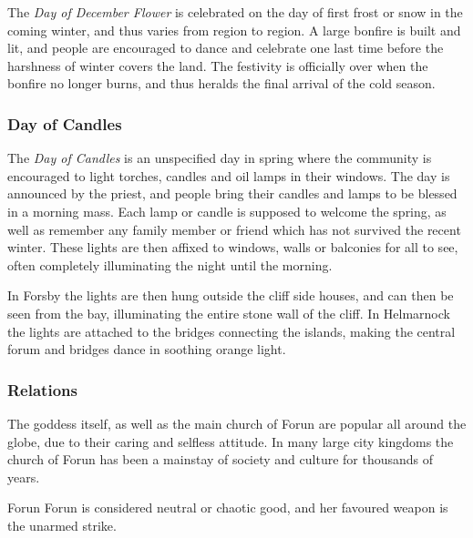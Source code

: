 
The \emph{Day of December Flower} is celebrated on the day of first frost or
snow in the coming winter, and thus varies from region to region. A large
bonfire is built and lit, and people are encouraged to dance and celebrate one
last time before the harshness of winter covers the land. The festivity is
officially over when the bonfire no longer burns, and thus heralds the final
arrival of the cold season.

\subsubsection*{Day of Candles}

The \emph{Day of Candles} is an unspecified day in spring where the community
is encouraged to light torches, candles and oil lamps in their windows. The
day is announced by the priest, and people bring their candles and lamps to be
blessed in a morning mass. Each lamp or candle is supposed to welcome the
spring, as well as remember any family member or friend which has not survived
the recent winter. These lights are then affixed to windows, walls or balconies
for all to see, often completely illuminating the night until the morning.

In Forsby the lights are then hung outside the cliff side houses, and can
then be seen from the bay, illuminating the entire stone wall of the cliff. In
Helmarnock the lights are attached to the bridges connecting the islands,
making the central forum and bridges dance in soothing orange light.

\subsubsection*{Relations}

The goddess itself, as well as the main church of Forun are popular all around
the globe, due to their caring and selfless attitude. In many large city
kingdoms the church of Forun has been a mainstay of society and culture for
thousands of years.

\begin{35e}{Forun}
  Forun is considered neutral or chaotic good, and her favoured weapon is the
  unarmed strike.
\end{35e}
